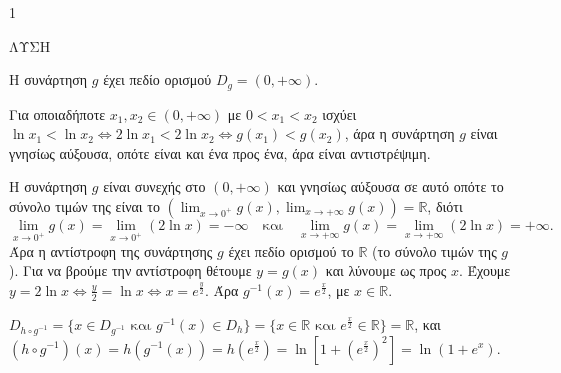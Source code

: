 \begin{ylh}{1}
    \item [Ύλη από εικόνα]
\end{ylh}
ΛΥΣΗ

Η συνάρτηση $g$ έχει πεδίο ορισμού $D_g = (0, +\infty)$.
\begin{rlist}
\item Για οποιαδήποτε $x_1, x_2 \in (0, +\infty)$ με $0 < x_1 < x_2$ ισχύει
$\ln x_1 < \ln x_2 \Leftrightarrow 2\ln x_1 < 2\ln x_2 \Leftrightarrow g(x_1) < g(x_2)$, άρα η συνάρτηση $g$ είναι γνησίως αύξουσα, οπότε είναι και ένα προς ένα, άρα είναι αντιστρέψιμη.
\item Η συνάρτηση $g$ είναι συνεχής στο $(0, +\infty)$ και γνησίως αύξουσα σε αυτό οπότε το σύνολο τιμών της είναι το $\left( \lim_{x \to 0^+} g(x), \lim_{x \to +\infty} g(x) \right) = \mathbb{R}$, διότι
\[ \lim_{x \to 0^+} g(x) = \lim_{x \to 0^+} (2\ln x) = -\infty \quad \text{και} \quad \lim_{x \to +\infty} g(x) = \lim_{x \to +\infty} (2\ln x) = +\infty . \]
Άρα η αντίστροφη της συνάρτησης $g$ έχει πεδίο ορισμού το $\mathbb{R}$ (το σύνολο τιμών της $g$). Για να βρούμε την αντίστροφη θέτουμε $y = g(x)$ και λύνουμε ως προς $x$.
Έχουμε $y = 2\ln x \Leftrightarrow \frac{y}{2} = \ln x \Leftrightarrow x = e^{\frac{y}{2}}$.
Άρα $g^{-1}(x) = e^{\frac{x}{2}}$, με $x \in \mathbb{R}$.
\end{rlist}
\begin{alist}
\item $D_{h \circ g^{-1}} = \{x \in D_{g^{-1}} \text{ και } g^{-1}(x) \in D_h \} = \{x \in \mathbb{R} \text{ και } e^{\frac{x}{2}} \in \mathbb{R} \} = \mathbb{R}$, και
$(h \circ g^{-1})(x) = h(g^{-1}(x)) = h(e^{\frac{x}{2}}) = \ln\left[1 + \left(e^{\frac{x}{2}}\right)^2 \right] = \ln(1 + e^x).$
\end{alist}